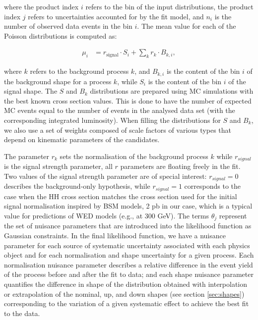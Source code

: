 \noindent where the product index $i$ refers to the bin of the input distributions, the product index $j$
refers to uncertainties accounted for by the fit model, and $n_i$ is the number of observed data
events in the bin $i$. The mean value for each of the Poisson distributions is computed as:

\begin{align*}
\mu_{i} &= r_{\text{signal}} \cdot S_{i} + \sum_{k}r_{k}\cdot B_{k,i},
\end{align*}

\noindent where $k$ refers to the background process $k$, and $B_{k,i}$ is the content of the bin $i$ of the background
shape for a process $k$, while $S_i$ is the content of the bin $i$ of the signal shape. The $S$ and $B_k$ distributions are prepared using MC simulations with the best known cross section values. This is done to have the number of expected MC events equal to the number of events in the analysed data set (with the corresponding integrated luminosity). When filling the distributions for $S$ and $B_k$, we also use a set of weights composed of scale factors of various types that depend on kinematic parameters of the candidates.

The parameter $r_k$ sets the normalisation of the background process $k$ while $r_{signal}$ is the signal strength parameter, all $r$ parameters are floating freely in the fit. Two values of the signal strength parameter are of special interest: $r_{signal} = 0$ describes the background-only hypothesis, while $r_{signal} = 1$ corresponds to the case when the HH cross section matches the cross section used for the initial signal normalisation inspired by BSM models, 2 pb in our case, which is a typical value for predictions of WED models (e.g., at 300 GeV). The terms $\theta_j$ represent the set of nuisance parameters that are introduced into the likelihood function as Gaussian constraints. In the final likelihood function, we have a nuisance parameter for each source of systematic uncertainty associated with each physics object and for each normalisation and shape uncertainty for a given process. Each normalisation nuisance parameter describes a relative difference in the event yield of the process before and after the fit to data; and each shape nuisance parameter quantifies the difference in shape of the \mTHH distribution obtained with interpolation or extrapolation of the nominal, up, and down shapes (see section \ref{sec:shapes}) corresponding to the variation of a given systematic effect to achieve the best fit to the data.

